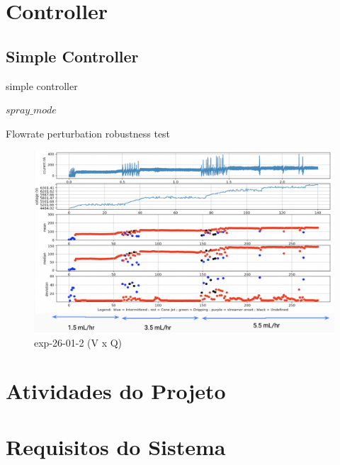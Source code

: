 \section{Controller}
\label{sec:controller_results}


\subsection{Simple Controller}

\begin{algorithm}
    \caption{simple controller}\label{alg:simple_controller}
    \begin{algorithmic}
        
            \State {}
            \State {}
        \EndIf

    \Return $spray\_ mode$
    \EndFunction
    \end{algorithmic}
\end{algorithm}

Flowrate perturbation robustness test

\begin{figure}[H]
    \center
    \includegraphics[width=15cm]{Figuras/19:03/control_first_results.png}
    \caption{ exp-26-01-2 (V x Q)}
\end{figure}


\section{Atividades do Projeto}
\label{metodo3}

\section {Requisitos do Sistema}
\label{req}


\clearpage